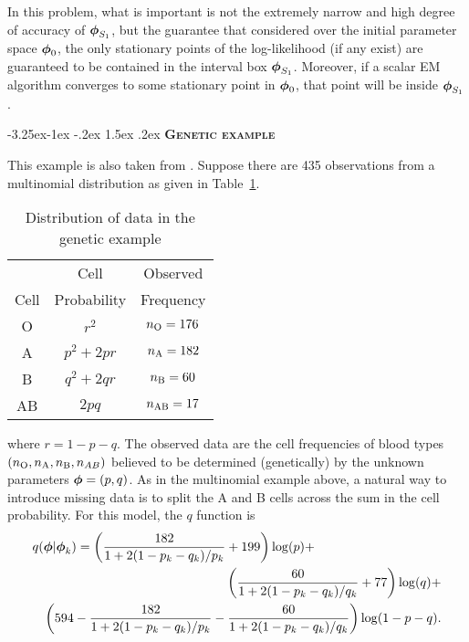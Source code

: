 \documentclass[10pt,twoside]{article}
\makeatletter
\renewcommand\subsection{\@startsection{subsection}{2}{\z@}%
                 {-3.25ex\@plus -1ex \@minus -.2ex}%
                 {1.5ex \@plus .2ex}%
                 {\scshape\centering\bfseries}} %
\makeatother
\begin{document}
In this problem, what is important is not the extremely narrow and
high degree of accuracy of $\mbox{\boldmath $\phi$}_{S_1}$, but the guarantee
that considered over the initial parameter space $\mbox{\boldmath $\phi$}_0$, the
only stationary points of the log-likelihood (if any exist)
are guaranteed to be contained in the interval box $\mbox{\boldmath $\phi$}_{S_1}$.
Moreover, if a scalar EM algorithm converges to some stationary point in
$\mbox{\boldmath $\phi$}_0$, that point will be inside $\mbox{\boldmath $\phi$}_{S_1}$.

\subsection{\textsc \bf Genetic example}

This example is also taken from \cite{McLachlan:Book}.
Suppose there are 435 observations from a multinomial distribution
as given in Table~\ref{genetic:table}.
\begin{table}[!ht]
\caption{\sffamily Distribution of data in the genetic example 
\label{genetic:table}}
\begin{center}
\begin{tabular}{ccc}
\hline\hline
&     Cell         &  Observed \\
Cell & Probability & Frequency \\ \hline
O  & $r^2$ & $n_{\rm O} = 176$ \\
A  & $p^2 + 2pr$ & $n_{\rm A} = 182$ \\
B  & $q^2 + 2qr$ & $n_{\rm B} = 60$ \\
AB & $2pq$ & $n_{\rm AB} = 17$ \\
\hline
\end{tabular}
\end{center}
\end{table}
where $r= 1-p-q$.  The observed data are the cell frequencies of blood types
$(n_{\rm O}, n_{\rm A}, n_{\rm B}, n_{AB})$ believed to be determined (genetically) 
by the unknown parameters $\mbox{\boldmath $\phi$} = (p,q)$.
As in the multinomial example above, a natural way to introduce
missing data is to split the A and B cells across the sum in the
cell probability.  For this model, the $q$ function is
\begin{eqnarray}
\lefteqn{ q(\bfphi|\bfphi_k) = \left(\frac{182}{1+2(1-p_k-q_k)/p_k} +
199\right) \log(p) + } \nonumber \\ \nonumber
& & \left(\frac{60}{1+2(1-p_k-q_k)/q_k} + 77\right) \log(q) + \\
& &  \left( 594 - \frac{182}{1+2(1-p_k-q_k)/p_k} -
\frac{60}{1+2(1-p_k-q_k)/q_k}\right) \log(1-p-q).
\end{eqnarray}
\end{document}
